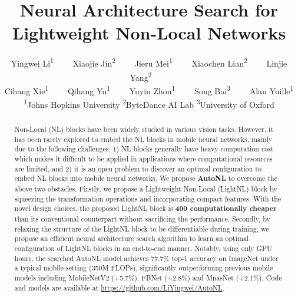 \documentclass[10pt,twocolumn,letterpaper]{article}
\begin{document}
\title{Neural Architecture Search for Lightweight Non-Local Networks}
\author{
Yingwei Li\textsuperscript{\rm 1}~~~~
Xiaojie Jin\textsuperscript{\rm 2}~~~~
Jieru Mei\textsuperscript{\rm 1}~~~~
Xiaochen Lian\textsuperscript{\rm 2}~~~~
Linjie Yang\textsuperscript{\rm 2}~~~~\\
Cihang Xie\textsuperscript{\rm 1}~~~~
Qihang Yu\textsuperscript{\rm 1}~~~~
Yuyin Zhou\textsuperscript{\rm 1}~~~~
Song Bai\textsuperscript{\rm 3}~~~~ 
Alan Yuille\textsuperscript{\rm 1} \\
\textsuperscript{\rm 1}Johns Hopkins University \qquad\qquad
\textsuperscript{\rm 2}ByteDance AI Lab \qquad\qquad
\textsuperscript{\rm 3}University of Oxford \\
\vspace{-.5em}
}

\maketitle
\thispagestyle{empty}

\begin{abstract}
Non-Local (NL) blocks have been widely studied in various vision tasks. However, it has been rarely explored to embed the NL blocks in mobile neural networks, mainly due to the following challenges: 1) NL blocks generally have heavy computation cost which makes it difficult to be applied in applications where computational resources are limited, and 2) it is an open problem to discover an optimal configuration to embed NL blocks into mobile
neural networks.
We propose \textbf{AutoNL} to overcome the above two obstacles. Firstly, we propose a Lightweight Non-Local (LightNL) block by squeezing the transformation operations and incorporating compact features. With the novel design choices, the proposed LightNL block is \textbf{400 computationally cheaper} than its conventional counterpart without sacrificing the performance. Secondly, by relaxing the structure of the LightNL block to be differentiable during training, we propose an efficient neural architecture search algorithm to learn an optimal configuration of LightNL blocks in an end-to-end manner. Notably, using only  GPU hours, the searched AutoNL model achieves 77.7\% top-1 accuracy on ImageNet under a typical mobile setting (350M FLOPs), significantly outperforming previous mobile models including MobileNetV2 (+5.7\%), FBNet (+2.8\%) and MnasNet (+2.1\%). Code and models are available at \url{https://github.com/LiYingwei/AutoNL}.
\end{abstract}
\end{document}
